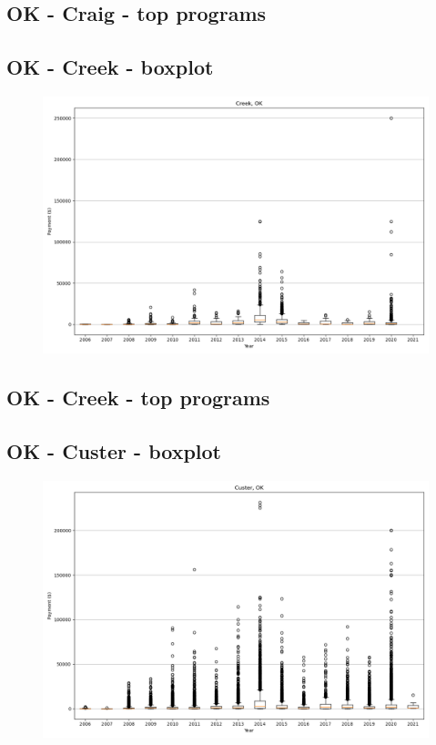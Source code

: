 \subsection*{OK - Craig - top programs}

\newpage
\subsection*{OK - Creek - boxplot}
\begin{figure}[h]
\centering
\includegraphics[width=7in]{../output/boxplots/counties/Creek-OK_boxplot.png}
\end{figure}


\subsection*{OK - Creek - top programs}

\newpage
\subsection*{OK - Custer - boxplot}
\begin{figure}[h]
\centering
\includegraphics[width=7in]{../output/boxplots/counties/Custer-OK_boxplot.png}
\end{figure}


